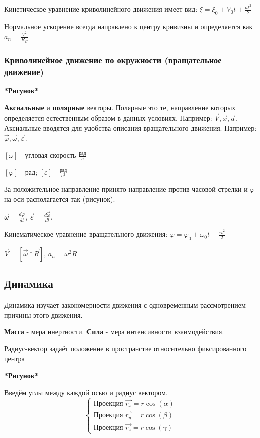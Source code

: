 \documentclass[a4paper,oneside]{article}
\theoremstyle{definition}
\theoremstyle{definition}
\theoremstyle{definition}
\newcommand{\tbf}[1]{\textbf{#1}}
\begin{document}
Кинетическое уравнение криволинейного движения имеет вид: $\xi = \xi_0 + V_0t + \frac {at^2} {2}$

Нормальное ускорение всегда направлено к центру кривизны и определяется как $a_n = \frac {V^2} {R_C}$

\subsubsection{Криволинейное движение по окружности (вращательное движение)}

\tbf{*Рисунок*}

\tbf{Аксиальные} и \tbf{полярные} векторы. Полярные это те, направление которых определяется естественным образом
в данных условиях. Например: $\vec{V}, \vec{x}, \vec{a}$. Аксиальные вводятся для удобства
описания вращательного движения. Например: $\vec{\varphi}, \vec{\omega}, \vec{\varepsilon}$.

$[ \omega ]$ - угловая скорость $\frac{\text{рад}} {c}$

$[ \varphi ]$ - $\text{рад}$; $[ \varepsilon ]$ - $\frac{\text{рад}} {c^2}$

За положительное направление принято направление против часовой стрелки и $\varphi$ на оси 
располагается так (рисунок).

$\vec{\omega} = \frac {d\varphi} {dt}$, $\vec{\varepsilon} = \frac{d\vec{\omega}} {dt}$.

Кинематическое уравнение вращательного движения: $\varphi = \varphi_0 + \omega_0t + \frac {\varepsilon t^2} {2}$

$\vec{V} = [ \vec{\omega} * \vec{R} ]$, $a_n = \omega^2R$

\subsection{Динамика}
Динамика изучает закономерности движения с одновременным рассмотрением причины этого движения.

\tbf{Масса} - мера инертности. \tbf{Сила} - мера интенсивности взаимодействия.

Радиус-вектор задаёт положение в пространстве относительно фиксированного центра

\tbf{*Рисунок*}

Введём углы между каждой осью и радиус вектором.
\[
\begin{cases}
    \text{Проекция } \vec{r_x} = r \cos(\alpha) \\
    \text{Проекция } \vec{r_y} = r \cos(\beta) \\
    \text{Проекция } \vec{r_z} = r \cos(\gamma)
\end{cases}
\]
\end{document}
